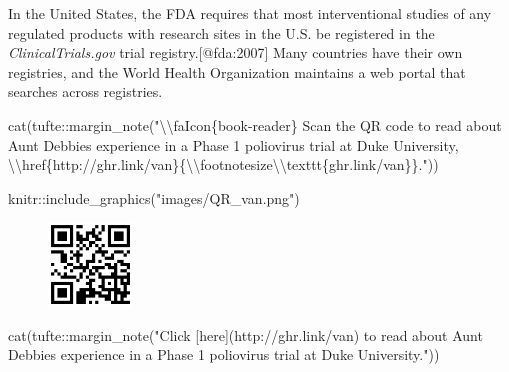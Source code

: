 \documentclass[
  letterpaper,
  DIV=11,
  numbers=noendperiod,
  oneside]{scrartcl}
\newenvironment{Shaded}{\begin{snugshade}}{\end{snugshade}}
\newcommand{\FunctionTok}[1]{\textcolor[rgb]{0.28,0.35,0.67}{#1}}
\newcommand{\NormalTok}[1]{\textcolor[rgb]{0.00,0.23,0.31}{#1}}
\newcommand{\SpecialCharTok}[1]{\textcolor[rgb]{0.37,0.37,0.37}{#1}}
\newcommand{\StringTok}[1]{\textcolor[rgb]{0.13,0.47,0.30}{#1}}
\begin{document}
In the United States, the FDA requires that most interventional studies
of any regulated products with research sites in the U.S. be registered
in the \emph{ClinicalTrials.gov} trial registry.{[}@fda:2007{]} Many
countries have their own registries, and the World Health Organization
maintains a web portal that searches across registries.

\begin{Shaded}
\begin{Highlighting}[]
\FunctionTok{cat}\NormalTok{(tufte}\SpecialCharTok{::}\FunctionTok{margin\_note}\NormalTok{(}\StringTok{"}\SpecialCharTok{\textbackslash{}\textbackslash{}}\StringTok{faIcon\{book{-}reader\} Scan the QR code to read about Aunt Debbie\textquotesingle{}s experience in a Phase 1 poliovirus trial at Duke University, }\SpecialCharTok{\textbackslash{}\textbackslash{}}\StringTok{href\{http://ghr.link/van\}\{}\SpecialCharTok{\textbackslash{}\textbackslash{}}\StringTok{footnotesize}\SpecialCharTok{\textbackslash{}\textbackslash{}}\StringTok{texttt\{ghr.link/van\}\}."}\NormalTok{))}
\end{Highlighting}
\end{Shaded}


\begin{Shaded}
\begin{Highlighting}[]
\NormalTok{knitr}\SpecialCharTok{::}\FunctionTok{include\_graphics}\NormalTok{(}\StringTok{"images/QR\_van.png"}\NormalTok{)}
\end{Highlighting}
\end{Shaded}

\begin{figure}[H]

{\centering \includegraphics[width=0.2\textwidth,height=\textheight]{images/QR_van.png}

}

\end{figure}

\begin{Shaded}
\begin{Highlighting}[]
\FunctionTok{cat}\NormalTok{(tufte}\SpecialCharTok{::}\FunctionTok{margin\_note}\NormalTok{(}\StringTok{"Click [here](http://ghr.link/van) to read about Aunt Debbie\textquotesingle{}s experience in a Phase 1 poliovirus trial at Duke University."}\NormalTok{))}
\end{Highlighting}
\end{Shaded}
\end{document}
